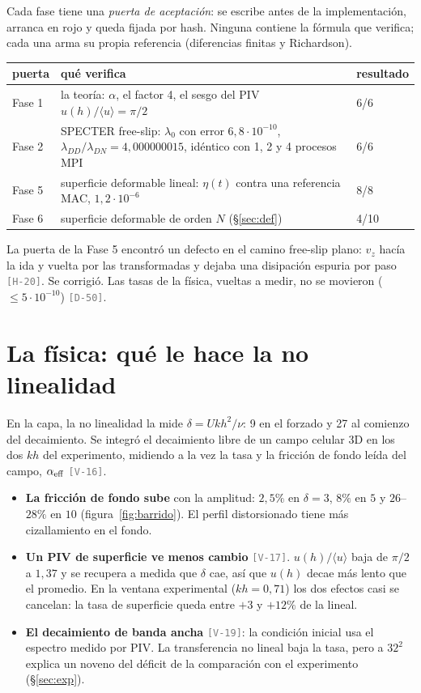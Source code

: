 \documentclass[11pt,a4paper]{article}
\newcommand{\avg}[1]{\langle #1\rangle}
\newcommand{\etq}[1]{\textcolor{gray}{\texttt{[#1]}}}
\begin{document}
Cada fase tiene una \emph{puerta de aceptación}: se escribe antes de la implementación,
arranca en rojo y queda fijada por hash. Ninguna contiene la fórmula que verifica; cada una
arma su propia referencia (diferencias finitas y Richardson).
\begin{center}\small
\begin{tabular}{lp{12.4cm}l}
\toprule
puerta & qué verifica & resultado\\
\midrule
Fase 1 & la teoría: $\alpha$, el factor 4, el sesgo del PIV $u(h)/\avg u=\pi/2$ & 6/6\\
Fase 2 & SPECTER free-slip: $\lambda_0$ con error $6{,}8\cdot10^{-10}$, $\lambda_{DD}/\lambda_{DN}=4{,}000000015$, idéntico con 1, 2 y 4 procesos MPI & 6/6\\
Fase 5 & superficie deformable lineal: $\eta(t)$ contra una referencia MAC, $1{,}2\cdot10^{-6}$ & 8/8\\
Fase 6 & superficie deformable de orden $N$ (§\ref{sec:def}) & 4/10\\
\bottomrule
\end{tabular}
\end{center}
La puerta de la Fase 5 encontró un defecto en el camino free-slip plano: $v_z$ hacía la ida y
vuelta por las transformadas y dejaba una disipación espuria por paso \etq{H-20}. Se corrigió.
Las tasas de la física, vueltas a medir, no se movieron ($\le5\cdot10^{-10}$) \etq{D-50}.

\section{La física: qué le hace la no linealidad}

En la capa, la no linealidad la mide
$\delta=Ukh^2/\nu$: 9 en el forzado y 27 al comienzo del decaimiento. Se integró el
decaimiento libre de un campo celular 3D en los dos $kh$ del experimento, midiendo a la vez la tasa y la
fricción de fondo leída del campo, $\alpha_{\rm eff}$ \etq{V-16}.
\begin{itemize}
\item \textbf{La fricción de fondo sube} con la amplitud: $2{,}5\%$ en $\delta=3$, $8\%$ en
  $5$ y $26$--$28\%$ en $10$ (figura~\ref{fig:barrido}). El perfil distorsionado tiene más
  cizallamiento en el fondo.
\item \textbf{Un PIV de superficie ve menos cambio} \etq{V-17}. $u(h)/\avg u$ baja de $\pi/2$ a
  $1{,}37$ y se recupera a medida que $\delta$ cae, así que $u(h)$ decae más lento que el
  promedio. En la ventana experimental ($kh=0{,}71$) los dos efectos casi se cancelan: la tasa
  de superficie queda entre $+3$ y $+12\%$ de la lineal.
\item \textbf{El decaimiento de banda ancha} \etq{V-19}: la condición inicial usa el espectro
  medido por PIV. La transferencia no lineal baja la tasa, pero a $32^2$ explica un noveno
  del déficit de la comparación con el experimento (§\ref{sec:exp}).
\end{itemize}
\end{document}
